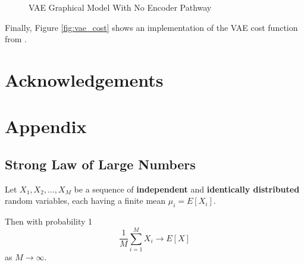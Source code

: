 \documentclass[11pt, oneside]{article}   	%
\begin{document}
\begin{figure}
\caption{VAE Graphical Model With No Encoder Pathway}
\label{fig:vae_no_encoder}
\end{figure}

\bigskip
\noindent
Finally, Figure \ref{fig:vae_cost} shows an implementation of the VAE cost function from \cite{Kingma:2013aa}.


\section{Acknowledgements}




\section{Appendix}
\subsection{Strong Law of Large Numbers}
\label{sec:slln}

Let $X_{1}, X_{2}, \hdots, X_{M}$ be a sequence of \textbf{independent} and \textbf{identically distributed} random variables, each having a finite mean $\mu_i = E[X_{i}]$. 

\bigskip
\noindent
Then with probability 1
\begin{equation}
\frac{1}{M}\sum\limits_{i=1}^{M} X_i \rightarrow E[X]
\end{equation}
as  $M \rightarrow \infty$.
\end{document}
